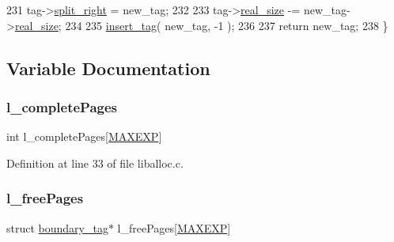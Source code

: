 \begin{DoxyCode}
231                         tag->\hyperlink{a00126_a9d43c9c4ff5ae35908dcfed0aec1907a_a9d43c9c4ff5ae35908dcfed0aec1907a}{split\_right} = new\_tag;
232     
233                         tag->\hyperlink{a00126_ad22b1c69bdce419783ac165f7f354245_ad22b1c69bdce419783ac165f7f354245}{real\_size} -= new\_tag->\hyperlink{a00126_ad22b1c69bdce419783ac165f7f354245_ad22b1c69bdce419783ac165f7f354245}{real\_size};
234     
235                         \hyperlink{a00035_a569f88ed08d8435e256dd225afcd26df_a569f88ed08d8435e256dd225afcd26df}{insert\_tag}( new\_tag, -1 );
236     
237     \textcolor{keywordflow}{return} new\_tag;
238 \}
\end{DoxyCode}


\subsection{Variable Documentation}
\mbox{\label{a00035_a213db3baf1d4b13d604015489247980d_a213db3baf1d4b13d604015489247980d}} 
\subsubsection{\texorpdfstring{l\+\_\+complete\+Pages}{l\_completePages}}
{\footnotesize\ttfamily int l\+\_\+complete\+Pages\mbox{[}\hyperlink{a00035_af823bb7d083fafbd662be7ea09582013_af823bb7d083fafbd662be7ea09582013}{M\+A\+X\+E\+XP}\mbox{]}}



Definition at line 33 of file liballoc.\+c.

\mbox{\label{a00035_a78b8b6e448179d3cd64915f99fee60e0_a78b8b6e448179d3cd64915f99fee60e0}} 
\subsubsection{\texorpdfstring{l\+\_\+free\+Pages}{l\_freePages}}
{\footnotesize\ttfamily struct \hyperlink{a00126}{boundary\+\_\+tag}$\ast$ l\+\_\+free\+Pages\mbox{[}\hyperlink{a00035_af823bb7d083fafbd662be7ea09582013_af823bb7d083fafbd662be7ea09582013}{M\+A\+X\+E\+XP}\mbox{]}}



